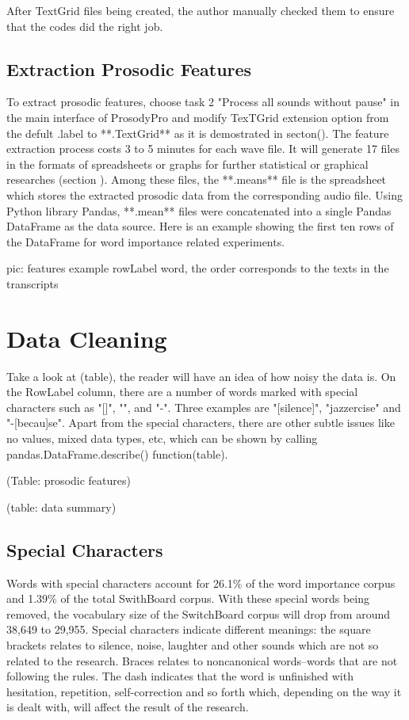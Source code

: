 After TextGrid files being created, the author manually checked them to ensure that the codes did the right job.

\subsection{Extraction Prosodic Features}
To extract prosodic features, choose task 2 "Process all sounds without pause" in the main interface of ProsodyPro and modify TexTGrid extension option from the defult .label to **.TextGrid** as it is demostrated in secton(). The feature extraction process costs 3 to 5 minutes for each wave file. It will generate 17 files in the formats of spreadsheets or graphs for further statistical or graphical researches (section ). Among these files, the **.means** file is the spreadsheet which stores the extracted prosodic data from the corresponding audio file. Using Python library Pandas, **.mean** files were concatenated into a single Pandas DataFrame as the data source. Here is an example showing the first ten rows of the DataFrame for word importance related experiments.

pic: features example  rowLabel word, the order corresponds to the texts in the transcripts 

\section{Data Cleaning}
Take a look at (table), the reader will have an idea of how noisy the data is. On the RowLabel column, there are a number of words marked with special characters such as "[]", "{}", and "-". Three examples are "[silence]", "{jazzercise}" and "-[becau]se". Apart from the special characters, there are other subtle issues like no values, mixed data types, etc, which can be shown by calling pandas.DataFrame.describe() function(table).

(Table: prosodic features)

(table: data summary)

\subsection{Special Characters}
Words with special characters account for 26.1\% of the word importance corpus and 1.39\% of the total SwithBoard corpus. With these special words being removed, the vocabulary size of the SwitchBoard corpus will drop from around 38,649 to 29,955. Special characters indicate different meanings: the square brackets relates to silence, noise, laughter and other sounds which are not so related to the research. Braces relates to noncanonical words--words that are not following the rules. The dash indicates that the word is unfinished with hesitation, repetition, self-correction and so forth which, depending on the way it is dealt with, will affect the result of the research. 


